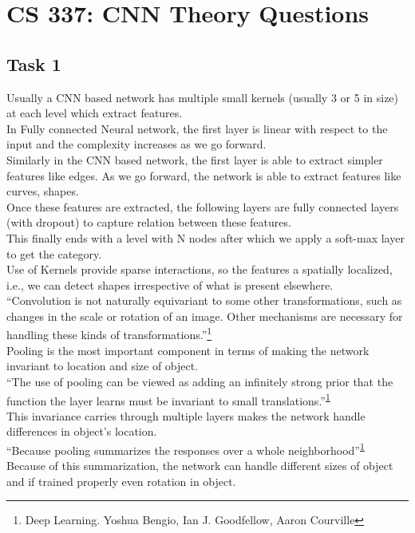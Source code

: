 \documentclass[12pt, fleqn]{article}
\begin{document}
\newpage
\section{CS 337: CNN Theory Questions}
\subsection{Task 1}
Usually a CNN based network has multiple small kernels (usually 3 or 5 in size) at each level which extract features. \\
In Fully connected Neural network, the first layer is linear with respect to the input and the complexity increases as we go forward. \\
Similarly in the CNN based network, the first layer is able to extract simpler features like edges. As we go forward, the network is able to extract features like curves, shapes. \\
Once these features are extracted, the following layers are fully connected layers (with dropout) to capture relation between these features. \\
This finally ends with a level with N nodes after which we apply a soft-max layer to get the category. \\

Use of Kernels provide sparse interactions, so the features a spatially localized, i.e., we can detect shapes irrespective of what is present elsewhere. \\
``Convolution is not naturally equivariant to some other transformations, such as changes in the scale or rotation of an image. Other mechanisms are necessary
for handling these kinds of transformations.''\footnote{\label{note1} Deep Learning. Yoshua Bengio, Ian J. Goodfellow, Aaron Courville} \\
Pooling is the most important component in terms of making the network invariant to location and size of object. \\
``The use of pooling can be viewed as adding an infinitely strong prior that the function the layer learns must be invariant to small translations.''\textsuperscript{\ref{note1}} \\
This invariance carries through multiple layers makes the network handle differences in object's location. \\
``Because pooling summarizes the responses over a whole neighborhood''\textsuperscript{\ref{note1}} \\
Because of this summarization, the network can handle different sizes of object and if trained properly even rotation in object. \\
\end{document}

